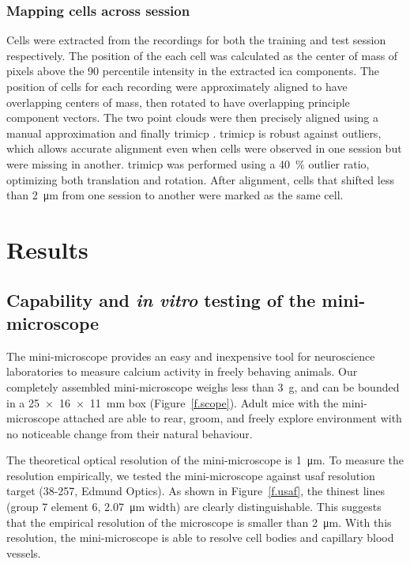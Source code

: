 \subsubsection{Mapping cells across session}
Cells were extracted from the recordings for both the training and test session respectively. The position of the each cell was calculated as the center of mass of pixels above the \num{90} percentile intensity in the extracted \gls{ica} components. The position of cells for each recording were approximately aligned to have overlapping centers of mass, then rotated to have overlapping principle component vectors. The two point clouds were then precisely aligned using a manual approximation and finally \gls{trimicp} \citep{chetverikov02}. \Gls{trimicp} is robust against outliers, which allows accurate alignment even when cells were observed in one session but were missing in another. \Gls{trimicp} was performed using a \SI{40}{\percent} outlier ratio, optimizing both translation and rotation. After alignment, cells that shifted less than \SI{2}{\um} from one session to another were marked as the same cell. 


\section{Results}

\subsection{Capability and \textit{in vitro} testing of the mini-microscope}
The mini-microscope provides an easy and inexpensive tool for neuroscience laboratories to measure calcium activity in freely behaving animals. Our completely assembled mini-microscope weighs less than \SI{3}{\g}, and can be bounded in a \SI{25 x 16 x 11}{\mm} box (Figure~\ref{f.scope}). Adult mice with the mini-microscope attached are able to rear, groom, and freely explore environment with no noticeable change from their natural behaviour.

The theoretical optical resolution of the mini-microscope is \SI{1}{\um}. To measure the resolution empirically, we tested the mini-microscope against \gls{usaf} resolution target (38-257, Edmund Optics). As shown in Figure~\ref{f.usaf}, the thinest lines (group 7 element 6, \SI{2.07}{\um} width) are clearly distinguishable. This suggests that the empirical resolution of the microscope is smaller than \SI{2}{\um}. With this resolution, the mini-microscope is able to resolve cell bodies and capillary blood vessels.

